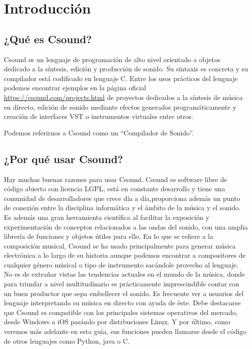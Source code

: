 
\chapter{Introducción}\label{cap1}
\section{¿Qué es Csound?}\label{sec:intro}

Csound es un lenguaje de programación de alto nivel orientado a objetos dedicado a la síntesis, edición y producción de sonido. Su sintaxis es concreta y su compilador está codificado en lenguaje C. Entre los usos prácticos del lenguaje podemos encontrar ejemplos en la página oficial \url{https://csound.com/projects.html} de proyectos dedicados a la síntesis de música en directo, edición de sonido mediante efectos generados programáticamente y creación de interfaces VST o instrumentos virtuales entre otros.

Podemos referirnos a Csound como un ``Compilador de Sonido''.

\section{¿Por qué usar Csound?}\label{sec:intro}

Hay muchas buenas razones para usar Csound. Csound es software libre de código abierto con licencia LGPL, está en constante desarrollo y tiene una comunidad de desarrolladores que crece día a día,proporciona además un punto de conexión entre la disciplina informática y el ámbito de la música y el sonido. 
Es además una gran herramienta científica al facilitar la exposición y experimentación de conceptos relacionados a las ondas del sonido, con una amplia librería de funciones y objetos útiles para ello. 
En lo que se refiere a la composición musical, Csound se ha usado principalmente para generar música electrónica a lo largo de su historia aunque podemos encontrar a compositores de cualquier género músical o tipo de instrumento sacándole provecho al lenguaje. No es de extrañar vistas las tendencias actuales en el mundo de la música, donde para triunfar a nivel multitudinario es prácticamente imprescindible contar con un buen productor que sepa embellecer el sonido.
Es frecuente ver a usuarios del lenguaje interpretando su música en directo con ayuda de éste.
Debe destacarse que Csound es compatible con los principales sistemas operativos del mercado, desde Windows a iOS pasándo por distrbuciones Linux. Y por último, como veremos más adelante en esta guía, sus funciones pueden llamarse desde el código de otros lenguajes como Python, java o C.
\pagebreak

